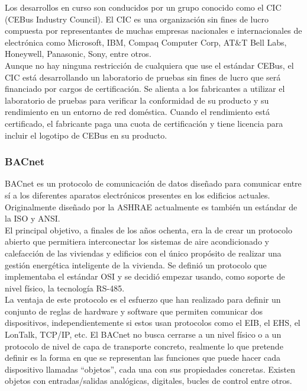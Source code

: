 Los desarrollos en curso son conducidos por un grupo conocido como el CIC (CEBus Industry Council). El CIC es una organización sin fines de lucro compuesta por representantes de muchas empresas nacionales e internacionales de electrónica como Microsoft, IBM, Compaq Computer Corp, AT\&T Bell Labs, Honeywell, Panasonic, Sony, entre otros.\\

Aunque no hay ninguna restricción de cualquiera que use el estándar CEBus, el CIC está desarrollando un laboratorio de pruebas sin fines de lucro que será financiado por cargos de certificación. Se alienta a los fabricantes a utilizar el laboratorio de pruebas para verificar la conformidad de su producto y su rendimiento en un entorno de red doméstica. Cuando el rendimiento está certificado, el fabricante paga una cuota de certificación y tiene licencia para incluir el logotipo de CEBus en su producto.

\subsubsection{BACnet}
BACnet es un protocolo de comunicación de datos diseñado para comunicar entre sí a los diferentes aparatos electrónicos presentes en los edificios actuales. Originalmente diseñado por la ASHRAE actualmente es también un estándar de la ISO y ANSI.\cite{serconint}\\

El principal objetivo, a finales de los años ochenta, era la de crear un protocolo abierto que permitiera interconectar los sistemas de aire acondicionado y calefacción de las viviendas y edificios con el único propósito de realizar una gestión energética inteligente de la vivienda. Se definió un protocolo que implementaba el estándar OSI y se decidió empezar usando, como soporte de nivel físico, la tecnología RS-485.\cite{iecor}\\

La ventaja de este protocolo es el esfuerzo que han realizado para definir un conjunto de reglas de hardware y software que permiten comunicar dos dispositivos, independientemente si estos usan protocolos como el EIB, el EHS, el LonTalk, TCP/IP, etc. El BACnet no busca cerrarse a un nivel físico o a un protocolo de nivel de capa de transporte concreto, realmente lo que pretende definir es la forma en que se representan las funciones que puede hacer cada dispositivo llamadas “objetos”, cada una con sus propiedades concretas. Existen objetos con entradas/salidas analógicas, digitales, bucles de control entre otros. 

